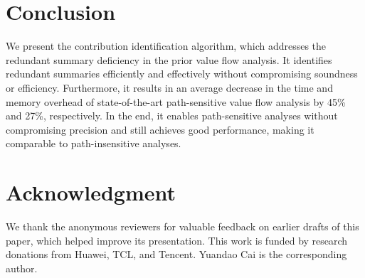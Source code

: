 


\section{Conclusion}
We present the contribution identification algorithm, which addresses the redundant summary deficiency in the prior value flow analysis. 
It identifies redundant summaries efficiently and effectively without compromising soundness or efficiency.
Furthermore, it results in an average decrease in the time and memory overhead of state-of-the-art path-sensitive value flow analysis by 45\% and 27\%, respectively.
In the end, it enables path-sensitive analyses without compromising precision and still achieves good performance, making it comparable to path-insensitive analyses.


\section{Acknowledgment}
We thank the anonymous reviewers for valuable feedback on earlier drafts of this paper, which helped improve its presentation.
This work is funded by research donations from Huawei, TCL, and Tencent. Yuandao Cai is the corresponding author.


